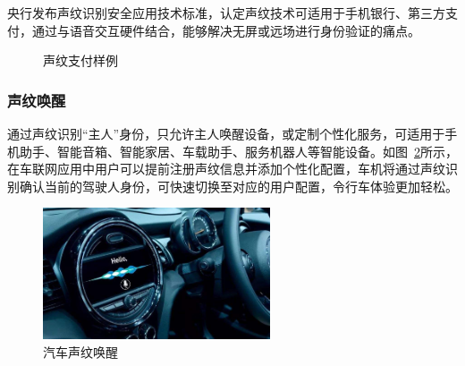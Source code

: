 央行发布声纹识别安全应用技术标准，认定声纹技术可适用于手机银行、第三方支付，通过与语音交互硬件结合，能够解决无屏或远场进行身份验证的痛点。
\begin{figure}
	\centering
	\caption{声纹支付样例}
	\label{pic:vprapp3}
\end{figure}

\subsubsection{声纹唤醒}
通过声纹识别“主人”身份，只允许主人唤醒设备，或定制个性化服务，可适用于手机助手、智能音箱、智能家居、车载助手、服务机器人等智能设备。如图~\ref{pic:vprapp4}所示，在车联网应用中用户可以提前注册声纹信息并添加个性化配置，车机将通过声纹识别确认当前的驾驶人身份，可快速切换至对应的用户配置，令行车体验更加轻松。

\begin{figure}[h!]
	\begin{center}
		\includegraphics[width=0.6\textwidth]{img/chapter_voiceprint/vpr_app4.png}
		\caption{汽车声纹唤醒}
		\label{pic:vprapp4}
	\end{center}
\end{figure}



